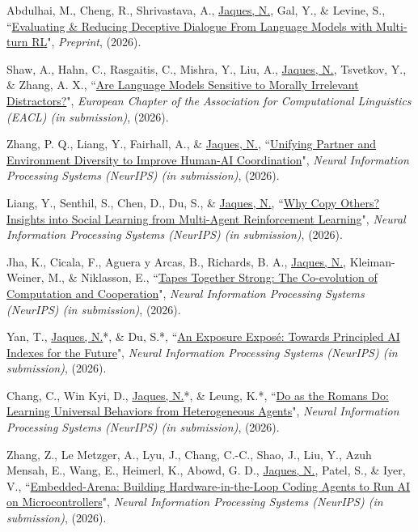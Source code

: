 \documentclass[paper=letter,fontsize=11pt]{scrartcl} %
\newcommand{\PaperEntry}[6]{
		\noindent #1, ``\href{#6}{#2}", \textit{#3}, #4 (#5).}
\begin{document}
\begin{etaremune}
\item \PaperEntry{Abdulhai, M., Cheng, R., Shrivastava, A., \underline{Jaques, N.}, Gal, Y., \& Levine, S.}{Evaluating \& Reducing Deceptive Dialogue From Language Models with Multi-turn RL}{Preprint}{}{2026}{https://arxiv.org/abs/2510.14318}

\item \PaperEntry{Shaw, A., Hahn, C., Rasgaitis, C., Mishra, Y., Liu, A., \underline{Jaques, N.}, Tsvetkov, Y., \& Zhang, A. X.}{Are Language Models Sensitive to Morally Irrelevant Distractors?}{European Chapter of the Association for Computational Linguistics (EACL) (in submission)}{}{2026}{https://arxiv.org/abs/2602.09416}


\item \PaperEntry{Zhang, P. Q., Liang, Y., Fairhall, A., \& \underline{Jaques, N.}}{Unifying Partner and Environment Diversity to Improve Human-AI Coordination}{Neural Information Processing Systems (NeurIPS) (in submission)}{}{2026}{}

\item \PaperEntry{Liang, Y., Senthil, S., Chen, D., Du, S., \& \underline{Jaques, N.}}{Why Copy Others? Insights into Social Learning from Multi-Agent Reinforcement Learning}{Neural Information Processing Systems (NeurIPS) (in submission)}{}{2026}{}


\item \PaperEntry{Jha, K., Cicala, F., Aguera y Arcas, B., Richards, B. A., \underline{Jaques, N.}, Kleiman-Weiner, M., \& Niklasson, E.}{Tapes Together Strong: The Co-evolution of Computation and Cooperation}{Neural Information Processing Systems (NeurIPS) (in submission)}{}{2026}{https://arxiv.org/abs/2609.10817}

\item \PaperEntry{Yan, T., \underline{Jaques, N.}*, \& Du, S.*}{An Exposure Exposé: Towards Principled AI Indexes for the Future}{Neural Information Processing Systems (NeurIPS) (in submission)}{}{2026}{}

\item \PaperEntry{Chang, C., Win Kyi, D., \underline{Jaques, N.}*, \& Leung, K.*}{Do as the Romans Do: Learning Universal Behaviors from Heterogeneous Agents}{Neural Information Processing Systems (NeurIPS) (in submission)}{}{2026}{https://arxiv.org/abs/2606.18537}

\item \PaperEntry{Zhang, Z., Le Metzger, A., Lyu, J., Chang, C.-C., Shao, J., Liu, Y., Azuh Mensah, E., Wang, E., Heimerl, K., Abowd, G. D., \underline{Jaques, N.}, Patel, S., \& Iyer, V.}{Embedded-Arena: Building Hardware-in-the-Loop Coding Agents to Run AI on Microcontrollers}{Neural Information Processing Systems (NeurIPS) (in submission)}{}{2026}{https://arxiv.org/abs/2606.16190}


\end{etaremune}
\end{document}
